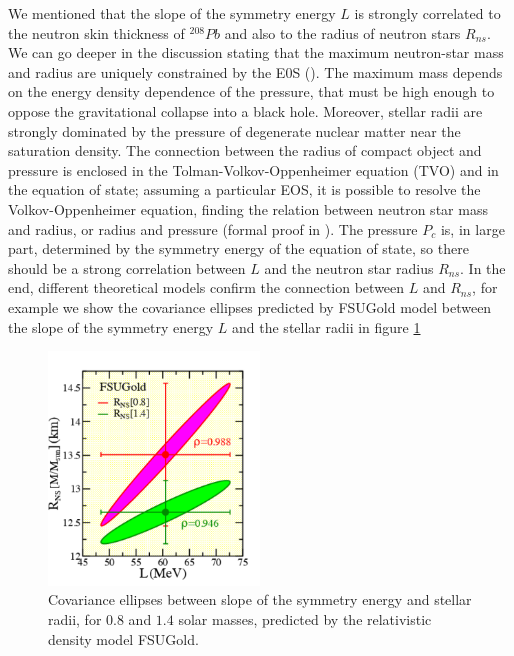 We mentioned that the slope of the symmetry energy $L$ is strongly correlated to the neutron skin thickness of $^{208}Pb$ and also to the radius of neutron stars $R_{ns}$. We can go deeper in the discussion stating that the maximum neutron-star mass and radius are uniquely constrained by the E0S (\cite{Lindblom1992DeterminingTN}). The maximum mass depends on the energy density dependence of the pressure, that must be high enough to oppose the gravitational collapse into a black hole. Moreover, stellar radii are strongly dominated by the pressure of degenerate nuclear matter near the saturation density. The connection between the radius of compact object and pressure is enclosed in the Tolman-Volkov-Oppenheimer equation (TVO) \cite{PhysRev.55.374} and in the equation of state; assuming a particular EOS, it is possible to resolve the Volkov-Oppenheimer equation, finding the relation between neutron star mass and radius, or radius and pressure (formal proof in \cite{LATTIMER_2007}). 
The pressure $P_{c}$ is, in large part, determined by the symmetry energy of the equation of state, so there should be a strong correlation between $L$ and the neutron star radius $R_{ns}$. In the end, different theoretical models \cite{PhysRevLett.95.122501} confirm the connection between $L$ and $R_{ns}$, for example we show the covariance ellipses predicted by FSUGold model between the slope of the symmetry energy $L$ and the stellar radii in figure \ref{fig:LvsRns}

\begin{figure}[hbtp]
\centering
\includegraphics[width = 0.5\textwidth]{Introduzione/LvsRns.pdf}
\caption{Covariance ellipses between slope of the symmetry energy and stellar radii, for $0.8$ and $1.4$ solar masses, predicted by the relativistic density model FSUGold.}
\label{fig:LvsRns}
\end{figure}


